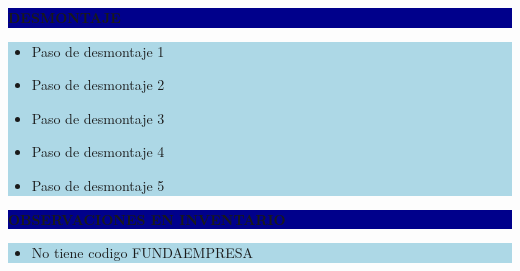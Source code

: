\documentclass[11pt]{article}
\newcommand{\seccionbanda}[1]{%
  \vspace{0.6em}
  \noindent\colorbox{darkblue}{\parbox{\dimexpr\linewidth-2\fboxsep}{%
    \centering\color{white}\bfseries #1}}\par\vspace{0.6em}
}
\begin{document}
\seccionbanda{DESMONTAJE}
\noindent\colorbox{lightblue}{\parbox{\dimexpr\linewidth-2\fboxsep\relax}{%
\begin{itemize}[label=$\square$, itemsep=4pt]
\item Paso de desmontaje 1
\item Paso de desmontaje 2
\item Paso de desmontaje 3
\item Paso de desmontaje 4
\item Paso de desmontaje 5
\end{itemize}
}}\par
\seccionbanda{OBSERVACIONES EN INVENTARIO}
\noindent\colorbox{lightblue}{\parbox{\dimexpr\linewidth-2\fboxsep\relax}{\begin{itemize}[itemsep=4pt]
\item No tiene codigo FUNDAEMPRESA
\end{itemize}}}\par
\end{document}
